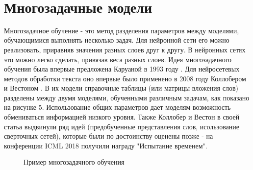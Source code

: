   \chapter{Многозадачные модели}\label{mtl} 

Многозадачное обучение - это метод разделения параметров между моделями, обучающимися выполнять несколько задач. Для нейронной сети его можно реализовать, приравняв значения разных слоев друг к другу.  В нейронных сетях это можно легко сделать, привязав веса разных слоев.  Идея многозадачного обучения была впервые предложена Каруаной в 1993 году \cite{Caruana_1997}. Для нейросетевых методов обработки текста оно впервые было применено в 2008 году Коллобером и Вестоном \cite{Collobert_Weston_2008}. В их модели справочные таблицы (или матрицы вложения слов) разделены между двумя моделями, обученными различным задачам, как показано на рисунке 5.
Использование общих параметров дает моделям возможность обмениваться информацией низкого уровня. Также Коллобер и Вестон в своей статьа выдвинули ряд идей (предобученные представления слов, исользование сверточных сетей), которые были по достоинству оценены позже - на конференции ICML 2018 получили награду "Испытание временем".


\begin{figure}[ht]
  \caption{Пример многозадачного обучения}\label{fig:MTL1}
\end{figure}

